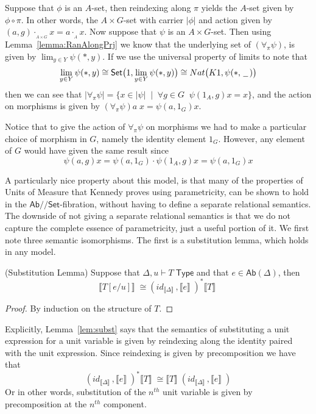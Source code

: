 \documentclass[a4paper,UKenglish]{lipics}
\newcommand{\UoM}{Units of Measure\xspace}
\newcommand{\msf}[1]{\mathsf{#1}} %
\newcommand{\Ab}{\msf{Ab}}
\newcommand{\Set}{\msf{Set}}
\newcommand{\blank}{\, \underline{\hspace{2mm}} \,}
\newcommand{\act}[1]{\cdot_{_{#1}}}
\newcommand{\GroupSet}[1]{#1/\!/\Set}
\newcommand{\AbSet}{\GroupSet{\Ab}}
\newcommand{\bbracket}[1]{\bigl( #1 \bigr)}
\newcommand{\sem}[1]{\ensuremath{\llbracket #1 \rrbracket} \;}
\begin{document}
Suppose that $\phi$ is an $A$-set, then reindexing along $\pi$ yields the $A$-set given by $\phi \circ \pi$. In other words, the $A \times G$-set with carrier $|\phi|$ and action given by $(a,g) \act{A\times G} x = a \act{A} x$. Now suppose that $\psi$ is an $A \times G$-set. Then using Lemma~\ref{lemma:RanAlongPrj} we know that the underlying set of $ (\forall _\pi \psi)$, is given by $\lim_{y\in Y} \psi (\ast, y)$. If we use the universal property of limits to note that
\[
 \lim_{y\in Y} \psi (\ast, y) \cong \Set \bbracket{1, \lim_{y\in Y} \psi (\ast, y)} \cong Nat \bbracket{K1, \psi (\ast, \blank)}
\]
then we can see that $|\forall_\pi \psi | = \{x \in |\psi| \; \; | \; \; \forall g\in G \; \; \psi(1_A, g) x = x \}$, and the action on morphisms is given by $(\forall_\pi \psi) a \; x = \psi (a, 1_G) x$.

Notice that to give the action of $\forall_\pi \psi$ on morphisms we had to make a particular choice of morphism in $G$, namely the identity element $1_G$. However, any element of $G$ would have given the same result since
\[
  \psi (a, g) x = \psi (a, 1_G) \cdot \psi (1_A, g) x = \psi (a, 1_G) x
\]

A particularly nice property about this model, is that many of the properties of \UoM that Kennedy proves using parametricity, can be shown to hold in the $\AbSet$-fibration, without having to define a separate relational semantics. The downside of not giving a separate relational semantics is that we do not capture the complete essence of parametricity, just a useful portion of it. We first note three semantic isomorphisms. The first is a substitution lemma, which holds in any model.

\begin{lemma}(Substitution Lemma)
\label{lem:subst}
Suppose that $\Delta, u \vdash T \; \msf{ Type}$ and that $e \in \Ab(\Delta)$, then
\[
 \sem{T[e/u]} \cong (id_{\sem{\Delta}} , \sem{e})^\ast \sem{T}
\]
\end{lemma}
\begin{proof}
 By induction on the structure of $T$.
\end{proof}


Explicitly, Lemma~\ref{lem:subst} says that the semantics of substituting a unit expression for a unit variable is given by reindexing along the identity paired with the unit expression. Since reindexing is given by precomposition we have that
\[
 (id_{\sem{\Delta}} , \sem{e})^\ast \sem{T} \cong \sem{T}(id_{\sem{\Delta}}, \sem{e})
\]
Or in other words, substitution of the $n^{th}$ unit variable is given by precomposition at the $n^{th}$ component.
\end{document}
